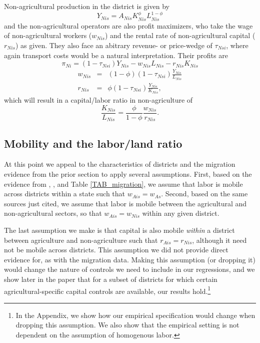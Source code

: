 \documentclass[12pt]{article}
\begin{document}
Non-agricultural production in the district is given by
\begin{equation}
	Y_{Nis} = A_{Nis} K_{Nis}^{\phi}L_{Nis}^{1-\phi} \label{EQ_nonag}
\end{equation}
and the non-agricultural operators are also profit maximizers, who take the wage of non-agricultural workers ($w_{Nis}$) and the rental rate of non-agricultural capital ($r_{Nis}$) as given. They also face an abitrary revenue- or price-wedge of $\tau_{Nsi}$, where again transport costs would be a natural interpretation. Their profits are
\begin{equation}
	\pi_{Ni} = (1-\tau_{Nsi}) Y_{Nis} - w_{Nis} L_{Nis} - r_{Nis} K_{Nis}
\end{equation}
\begin{eqnarray*}
    w_{Nis} &=& (1-\phi)(1-\tau_{Nsi}) \frac{Y_{Nis}}{L_{Nis}} \\ 
    r_{Nis} &=& \phi (1-\tau_{Nsi}) \frac{Y_{Nis}}{K_{Nis}},
\end{eqnarray*}
which will result in a capital/labor ratio in non-agriculture of
\begin{equation}
	\frac{K_{Nis}}{L_{Nis}} = \frac{\phi}{1-\phi} \frac{w_{Nis}}{r_{Nis}}. \label{EQ_KLnon}
\end{equation}

\subsection{Mobility and the labor/land ratio}
At this point we appeal to the characteristics of districts and the migration evidence from the prior section to apply several assumptions. First, based on the evidence from \cite{young2013inequality}, \cite{hklm2017}, and Table \ref{TAB_migration}, we assume that labor is mobile across districts within a state such that $w_{Ais} = w_{As}$. Second, based on the same sources just cited, we assume that labor is mobile between the agricultural and non-agricultural sectors, so that $w_{Ais} = w_{Nis}$ within any given district. 

The last assumption we make is that capital is also mobile \textit{within} a district between agriculture and non-agriculture such that $r_{Ais} = r_{Nis}$, although it need not be mobile across districts. This assumption we did not provide direct evidence for, as with the migration data. Making this assumption (or dropping it) would change the nature of controls we need to include in our regressions, and we show later in the paper that for a subset of districts for which certain agricultural-specific capital controls are available, our results hold.\footnote{In the Appendix, we show how our empirical specification would change when dropping this assumption. We also show that the empirical setting is not dependent on the assumption of homogenous labor.}
\end{document}
